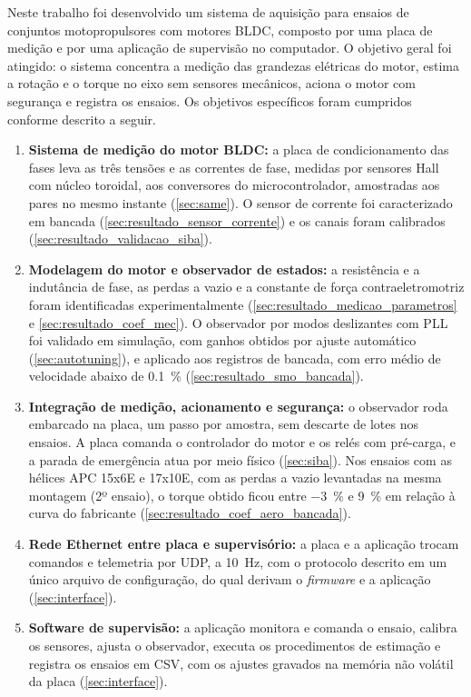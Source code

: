 \label{sec:conclusoes}

Neste trabalho foi desenvolvido um sistema de aquisição para ensaios de
conjuntos motopropulsores com motores BLDC, composto por uma placa de medição e
por uma aplicação de supervisão no computador. O objetivo geral foi atingido:
o sistema concentra a medição das grandezas elétricas do motor, estima a
rotação e o torque no eixo sem sensores mecânicos, aciona o motor com
segurança e registra os ensaios. Os objetivos específicos foram
cumpridos conforme descrito a seguir.

\begin{enumerate}
    \item \textbf{Sistema de medição do motor BLDC:} a placa de condicionamento
    das fases leva as três tensões e as correntes de fase, medidas por sensores
    Hall com núcleo toroidal, aos conversores do microcontrolador, amostradas
    aos pares no mesmo instante (\autoref{sec:same}). O sensor de corrente foi
    caracterizado em bancada (\autoref{sec:resultado_sensor_corrente}) e os
    canais foram calibrados (\autoref{sec:resultado_validacao_siba}).

    \item \textbf{Modelagem do motor e observador de estados:} a resistência e
    a indutância de fase, as perdas a vazio e a constante de força
    contraeletromotriz foram identificadas experimentalmente
    (\autoref{sec:resultado_medicao_parametros} e
    \autoref{sec:resultado_coef_mec}). O observador por modos deslizantes com
    PLL foi validado em simulação, com ganhos obtidos por ajuste automático
    (\autoref{sec:autotuning}), e aplicado aos registros de bancada, com erro
    médio de velocidade abaixo de \SI{0,1}{\percent}
    (\autoref{sec:resultado_smo_bancada}).

    \item \textbf{Integração de medição, acionamento e segurança:} o observador
    roda embarcado na placa, um passo por amostra, sem descarte de lotes nos
    ensaios. A placa comanda o controlador do motor e os relés com pré-carga, e
    a parada de emergência atua por meio físico (\autoref{sec:siba}). Nos
    ensaios com as hélices APC 15x6E e 17x10E, com as perdas a vazio
    levantadas na mesma montagem (2º ensaio), o torque obtido ficou entre \SI{-3}{\percent} e
    \SI{+9}{\percent} em relação à curva do fabricante
    (\autoref{sec:resultado_coef_aero_bancada}).

    \item \textbf{Rede Ethernet entre placa e supervisório:} a placa e a
    aplicação trocam comandos e telemetria por UDP, a \SI{10}{\hertz}, com o
    protocolo descrito em um único arquivo de configuração, do qual derivam o
    \textit{firmware} e a aplicação (\autoref{sec:interface}).

    \item \textbf{Software de supervisão:} a aplicação monitora e comanda o
    ensaio, calibra os sensores, ajusta o observador, executa os
    procedimentos de estimação e registra os ensaios em CSV, com os ajustes
    gravados na memória não volátil da placa (\autoref{sec:interface}).
\end{enumerate}

